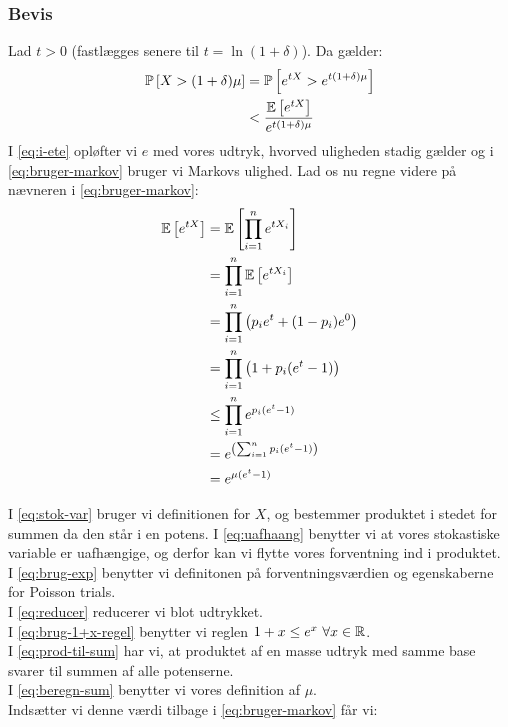 \subsubsection{Bevis}
Lad $t > 0$ (fastlægges senere til $t = \ln(1 + \delta)$). Da gælder:
\begin{align}
  \mathbb{P} \left[  X > (1+\delta) \mu  \right]
  &= \mathbb{P} \left[  e^{tX} > e^{t(1+\delta) \mu}  \right] \label{eq:i-ete} \\
  &< \frac{\mathbb{E} \left[  e^{tX}  \right]}{e^{t(1+\delta) \mu}} \label{eq:bruger-markov}
\end{align}
I \cref{eq:i-ete} opløfter vi $e$ med vores udtryk, hvorved uligheden stadig gælder og i \cref{eq:bruger-markov} bruger vi Markovs ulighed. Lad os nu regne videre på nævneren i \cref{eq:bruger-markov}:
\begin{align}
  \mathbb{E} \left[  e^{tX}  \right]
  &= \mathbb{E} \left[  \prod_{i=1}^n e^{t X_i}  \right] \label{eq:stok-var}\\
  &= \prod_{i=1}^n \mathbb{E} \left[  e^{t X_i}  \right] \label{eq:uafhaang}\\
  &= \prod_{i=1}^n \left( p_i e^t + (1-p_i) e^0  \right) \label{eq:brug-exp}\\
  &= \prod_{i=1}^n \left( 1 + p_i (e^t - 1) \right) \label{eq:reducer}\\
  &\leq \prod_{i=1}^n e^{p_i (e^t - 1)} \label{eq:brug-1+x-regel}\\
  &= e^{\left( \sum_{i=1}^n p_i (e^t - 1) \right)} \label{eq:prod-til-sum} \\
  &= e^{\mu (e^t - 1)} \label{eq:beregn-sum}
\end{align}

I \cref{eq:stok-var} bruger vi definitionen for $X$, og bestemmer produktet i stedet for summen da den står i en potens.
I \cref{eq:uafhaang} benytter vi at vores stokastiske variable er uafhængige, og derfor kan vi flytte vores forventning ind i produktet.\\
I \cref{eq:brug-exp} benytter vi definitonen på forventningsværdien og egenskaberne for Poisson trials.\\
I \cref{eq:reducer} reducerer vi blot udtrykket.\\
I \cref{eq:brug-1+x-regel} benytter vi reglen $1 + x \leq e^x \ \forall x \in {\mathbb R}$.\\
I \cref{eq:prod-til-sum} har vi, at produktet af en masse udtryk med samme base svarer til summen af alle potenserne.\\
I \cref{eq:beregn-sum} benytter vi vores definition af $\mu$.\\

Indsætter vi denne værdi tilbage i \cref{eq:bruger-markov} får vi:

